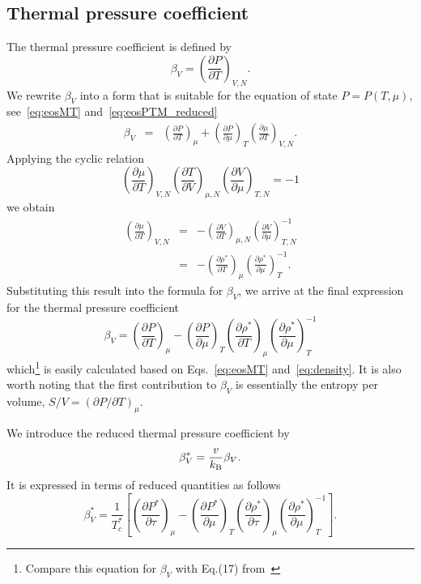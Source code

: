 \subsection{Thermal pressure coefficient}
The thermal pressure coefficient is defined by
\begin{equation}
	\label{def:therm_pres_coef}
	\beta_V = \left( \frac{\partial P}{\partial T} \right)_{V,N}.
\end{equation}
We rewrite $\beta_V$ into a form that is suitable for the equation of state $P=P(T,\mu)$, see~\eqref{eq:eosMT} and~\eqref{eq:eosPTM_reduced}
\begin{eqnarray}
	\beta_V	& = & \left(\frac{\partial P}{\partial T}\right)_{\mu} + \left(\frac{\partial P}{\partial \mu}\right)_T \left(\frac{\partial \mu}{\partial T}\right)_{V, N}.
\end{eqnarray}
Applying the cyclic relation
\begin{equation*}
	\left(\frac{\partial \mu}{\partial T}\right)_{V, N} 
	\left(\frac{\partial T}{\partial V}\right)_{\mu, N}
	\left(\frac{\partial V}{\partial \mu}\right)_{T, N}
	= -1
\end{equation*}
we obtain
\begin{eqnarray*}
	\left(\frac{\partial \mu}{\partial T}\right)_{V, N} 
	& = & 
	- \left(\frac{\partial V}{\partial T}\right)_{\mu, N} 
	\left(\frac{\partial V}{\partial \mu}\right)^{-1}_{T, N} \\
	& = & - \left(\frac{\partial \rho^*}{\partial T}\right)_{\mu}
	\left(\frac{\partial \rho^*}{\partial \mu}\right)^{-1}_{T}.		
\end{eqnarray*}
Substituting this result into the formula for $\beta_V$, we arrive at the final expression for the thermal pressure coefficient
\begin{equation}
	\beta_V = \left(\frac{\partial P}{\partial T}\right)_{\mu} 
	- \left(\frac{\partial P}{\partial \mu}\right)_T 
	\left(\frac{\partial \rho^*}{\partial T}\right)_{\mu}
	\left(\frac{\partial \rho^*}{\partial \mu}\right)^{-1}_{T}
\end{equation}
which\footnote{Compare this equation for $\beta_V$ with Eq.(17) from~\cite{StrokerMeier2021}} is easily calculated based on Eqs.~\eqref{eq:eosMT} and~\eqref{eq:density}. It is also worth noting that the first contribution to $\beta_V$ is essentially the entropy per volume, $S/V = (\partial P / \partial T)_\mu$.

We introduce the reduced thermal pressure coefficient by
\begin{equation}
	\beta^*_V = \frac{v}{k_{\rm B}}\beta_V.
\end{equation}
It is expressed in terms of reduced quantities as follows
\begin{equation}
	\label{eq:beta_star_m}
	\beta^*_V = \frac{1}{T^*_c} 
	\left[ \left(\frac{\partial P^*}{\partial \tau}\right)_{\mu} 
	- \left(\frac{\partial P^*}{\partial \mu}\right)_T 
	\left(\frac{\partial \rho^*}{\partial \tau}\right)_{\mu}
	\left(\frac{\partial \rho^*}{\partial \mu}\right)^{-1}_{T} 
	\right].
\end{equation}


